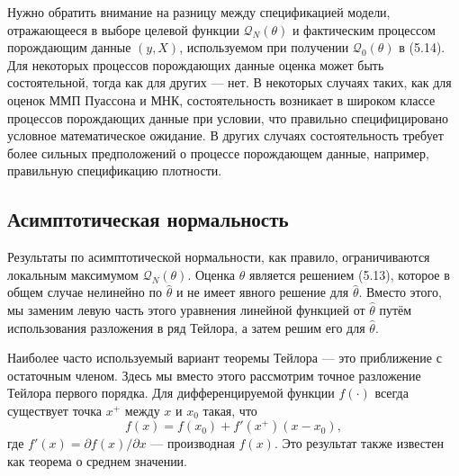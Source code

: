 Нужно обратить внимание на разницу между спецификацией модели, отражающееся в выборе целевой функции $\mathcal{Q}_N(\theta)$ и фактическим процессом порождающим данные $(y,X)$, используемом при получении $\mathcal{Q}_0(\theta)$ в (5.14). Для некоторых процессов порождающих данные оценка может быть состоятельной, тогда как для других --- нет. В некоторых случаях таких, как для оценок ММП Пуассона и МНК, состоятельность возникает в широком классе процессов порождающих данные при условии, что правильно специфицировано условное математическое ожидание. В других случаях состоятельность требует более сильных предположений о процессе порождающем данные, например, правильную спецификацию плотности.

\subsection{Асимптотическая нормальность}

Результаты по асимптотической нормальности, как правило, ограничиваются локальным максимумом $\mathcal{Q}_N(\theta)$. Оценка $\hat{\theta}$ является решением (5.13), которое в общем случае нелинейно по $\hat{\theta}$ и не имеет явного решение для $\hat{\theta}$. Вместо этого, мы заменим левую часть этого уравнения линейной функцией от $\hat{\theta}$ путём использования разложения в ряд Тейлора, а затем решим его для $\hat{\theta}$.

Наиболее часто используемый вариант теоремы Тейлора --- это приближение с остаточным членом. Здесь мы вместо этого рассмотрим точное разложение Тейлора первого порядка. Для дифференцируемой функции $f(\cdot)$ всегда существует точка $x^+$ между $x$ и $x_0$ такая, что
\[
f(x)=f(x_0)+f'(x^+)(x-x_0),
\]
где $f'(x)=\partial f(x) / \partial x$ --- производная $f(x)$. Это результат также известен как теорема о среднем значении.

